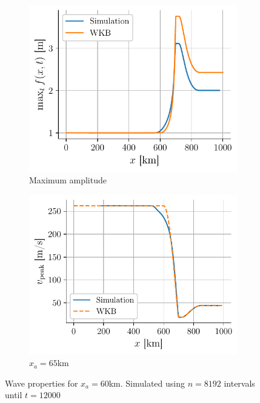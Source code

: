 \begin{figure}[h]
    \centering
    \begin{subfigure}{0.48\linewidth}
        \centering
        \includegraphics[width=\linewidth]{figures/corail_eq1_amplitude_xa=600000.0.pdf}
        \caption{Maximum amplitude}
        \label{fig:corail_eq1_amplitude_xa=60km}
    \end{subfigure}
    \begin{subfigure}{0.48\linewidth}
        \centering
        \includegraphics[width=\linewidth]{figures/corail_eq1_vitesse_xa=600000.0.pdf}
        \caption{\(x_a = 65\)km}
        \label{fig:corail_eq1_speed_xa=60km}
    \end{subfigure}
    \caption{Wave properties for \(x_a = 60\)km. Simulated using \(n=8192\) intervals until \(t=12000\)}
\end{figure}


